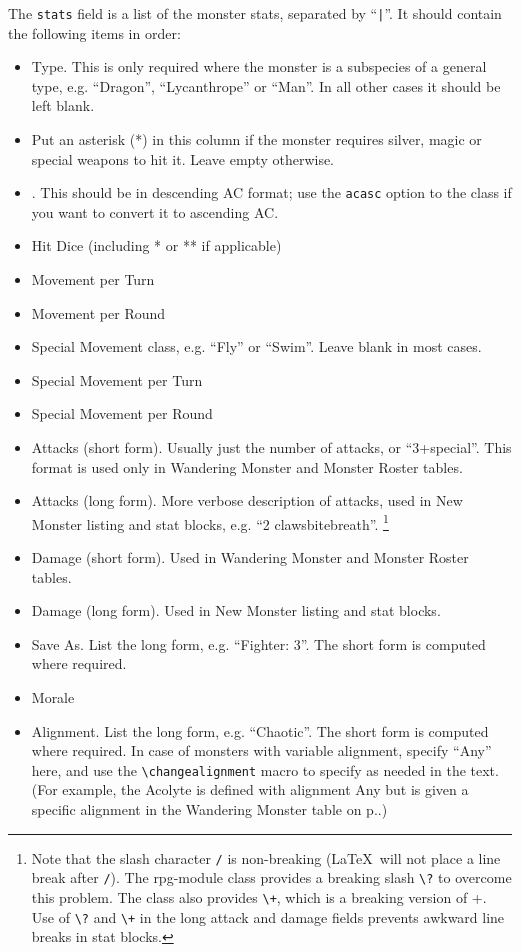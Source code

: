 \documentclass[a4paper,serif]{rpg-module}
\begin{document}
\noindent The \verb|stats| field is a list of the monster stats, separated by ``\verb:|:''. It should contain the following items in order:
\renewcommand{\labelitemi}{$\bullet$}
\begin{itemize}\setlength{\itemsep}{0pt}
\item Type. This is only required where the monster is a subspecies of a general type, e.g. ``Dragon'', ``Lycanthrope'' or ``Man''. In all other cases
it should be left blank.
\item Put an asterisk (*) in this column if the monster requires silver, magic or special weapons to hit it. Leave empty otherwise.
\item \ArmourClass. This should be in descending AC format; use the \verb|acasc| option to the class if you want to convert it to ascending AC.
\item Hit Dice (including * or ** if applicable)
\item Movement per Turn
\item Movement per Round
\item Special Movement class, e.g. ``Fly'' or ``Swim''. Leave blank in most cases.
\item Special Movement per Turn
\item Special Movement per Round
\item Attacks (short form). Usually just the number of attacks, or ``3+special''. This format is used only in Wandering Monster and Monster Roster tables.
\item Attacks (long form). More verbose description of attacks, used in New Monster listing and stat blocks, e.g. ``2 claws\?bite\+breath''.
\footnote{Note that the slash character \texttt{/} is non-breaking (\LaTeX~will not place a line break after \texttt{/}). The rpg-module class provides a breaking
slash \texttt{\textbackslash ?} to overcome this problem. The class also provides \texttt{\textbackslash +}, which is a breaking version of +. Use of
\texttt{\textbackslash ?} and \texttt{\textbackslash +} in the long attack and damage fields prevents awkward line breaks in stat blocks.}
\item Damage (short form). Used in Wandering Monster and Monster Roster tables.
\item Damage (long form). Used in New Monster listing and stat blocks.
\item Save As. List the long form, e.g. ``Fighter: 3''. The short form is computed where required.
\item Morale
\item Alignment. List the long form, e.g. ``Chaotic''. The short form is computed where required. In case of monsters with variable alignment, specify ``Any''
here, and use the \verb|\changealignment| macro to specify as needed in the text. (For example, the Acolyte is defined with alignment Any but is given a specific
alignment in the Wandering Monster table on p.\pageref{wanderingmonsters}.)


\end{itemize}
\end{document}
